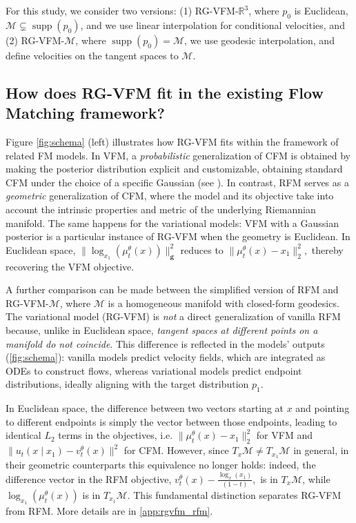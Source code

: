 For this study, we consider two versions: (1) RG-VFM-$\mathbb{R}^3$, where $p_0$ is Euclidean, $\mathcal{M} \subsetneq \operatorname{supp}(p_0)$, and we use linear interpolation for conditional velocities, and (2) RG-VFM-$\mathcal{M}$, where $\operatorname{supp}(p_0) = \mathcal{M}$, we use geodesic interpolation, and define velocities on the tangent spaces to $\mathcal{M}$.

\subsection{How does RG-VFM fit in the existing Flow Matching framework?}

Figure \ref{fig:schema} (left) illustrates how RG-VFM fits within the framework of related FM models. In VFM, a \textit{probabilistic} generalization of CFM is obtained by making the posterior distribution explicit and customizable, obtaining standard CFM under the choice of a specific Gaussian (see \cite{eijkelboom2024variational}). In contrast, RFM serves as a \textit{geometric} generalization of CFM, where the model and its objective take into account the intrinsic properties and metric of the underlying Riemannian manifold. The same happens for the variational models: VFM with a Gaussian posterior is a particular instance of RG-VFM when the geometry is Euclidean. In Euclidean space,
$
\|\log_{x_1}(\mu_t^{\theta}(x))\|_{\mathbf{g}}^2
$
reduces to
$
\|\mu_t^{\theta}(x) - x_1\|_2^2,
$
thereby recovering the VFM objective.

A further comparison can be made between the simplified version of RFM and RG-VFM-$\mathcal{M}$, where $\mathcal{M}$ is a homogeneous manifold with closed-form geodesics. The variational model (RG-VFM) is \textit{not} a direct generalization of vanilla RFM because, unlike in Euclidean space, \textit{tangent spaces at different points on a manifold do not coincide}. This difference is reflected in the models' outputs (\cref{fig:schema}): vanilla models predict velocity fields, which are integrated as ODEs to construct flows, whereas variational models predict endpoint distributions, ideally aligning with the target distribution $p_1$. 

In Euclidean space, the difference between two vectors starting at $x$ and pointing to different endpoints is simply the vector between those endpoints, leading to identical $L_2$ terms in the objectives, i.e. $\|\mu_t^{\theta}(x) - x_1\|_2^2$ for VFM and $\|u_t(x \mid x_1) - v_t^\theta(x)\|^2$ for CFM. However, since $T_{x}\mathcal{M} \neq T_{x_1}\mathcal{M}$ in general, in their geometric counterparts this equivalence no longer holds: indeed, the difference vector in the RFM objective,  
$
v_t^{\theta}(x) - \frac{\log_{x}(x_1)}{(1-t)},
$
is in $T_{x}\mathcal{M}$, while $\log_{x_1}(\mu_t^{\theta}(x))$ is in $T_{x_1}\mathcal{M}$. This fundamental distinction separates RG-VFM from RFM. More details are in \cref{app:rgvfm_rfm}.
